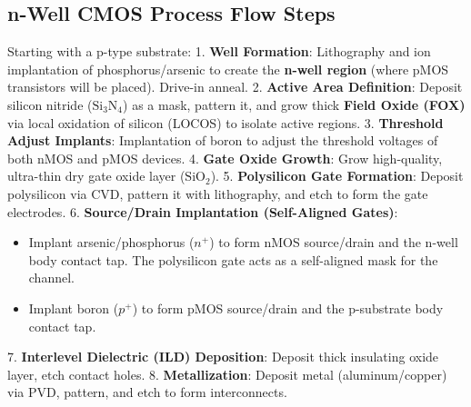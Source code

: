 \documentclass[12pt,a4paper]{article}
\begin{document}
\subsection{n-Well CMOS Process Flow Steps}
Starting with a p-type substrate:
1. \textbf{Well Formation}: Lithography and ion implantation of phosphorus/arsenic to create the \textbf{n-well region} (where pMOS transistors will be placed). Drive-in anneal.
2. \textbf{Active Area Definition}: Deposit silicon nitride ($\text{Si}_3\text{N}_4$) as a mask, pattern it, and grow thick \textbf{Field Oxide (FOX)} via local oxidation of silicon (LOCOS) to isolate active regions.
3. \textbf{Threshold Adjust Implants}: Implantation of boron to adjust the threshold voltages of both nMOS and pMOS devices.
4. \textbf{Gate Oxide Growth}: Grow high-quality, ultra-thin dry gate oxide layer ($\text{SiO}_2$).
5. \textbf{Polysilicon Gate Formation}: Deposit polysilicon via CVD, pattern it with lithography, and etch to form the gate electrodes.
6. \textbf{Source/Drain Implantation (Self-Aligned Gates)}:
   \begin{itemize}[leftmargin=*, noitemsep, topsep=2pt]
     \item Implant arsenic/phosphorus ($n^+$) to form nMOS source/drain and the n-well body contact tap. The polysilicon gate acts as a self-aligned mask for the channel.
     \item Implant boron ($p^+$) to form pMOS source/drain and the p-substrate body contact tap.
   \end{itemize}
7. \textbf{Interlevel Dielectric (ILD) Deposition}: Deposit thick insulating oxide layer, etch contact holes.
8. \textbf{Metallization}: Deposit metal (aluminum/copper) via PVD, pattern, and etch to form interconnects.
\end{document}

